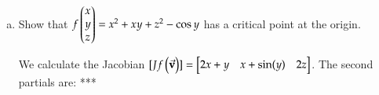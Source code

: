  \begin{enumerate}[a.]
	\item Show that $f\begin{pmatrix} x \\ y \\ z \end{pmatrix}=x^2+xy+z^2-\cos y$ has a critical point at the origin. 
	
	We calculate the Jacobian $[Jf\begin{pmatrix} \vec{\textbf{v}} \end{pmatrix}]=\begin{bmatrix} 2x+y & x+\sin(y) & 2z \end{bmatrix}$. The second partials are: ***

\end{enumerate}